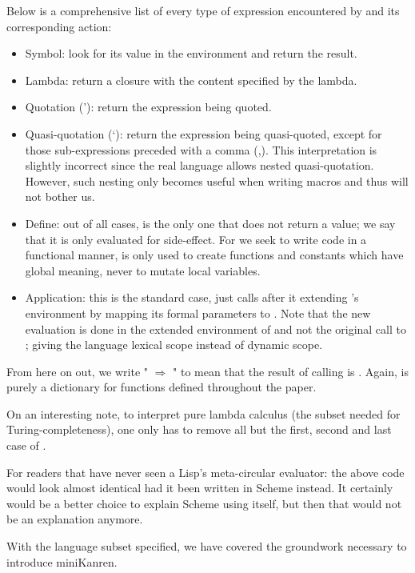 
Below is a comprehensive list of every type of expression encountered by  and its corresponding action:
\begin{itemize}
\item Symbol: look for its value in the environment and return the result.
\item Lambda: return a closure with the content specified by the lambda.
\item Quotation ('): return the expression being quoted.
\item Quasi-quotation (`): return the expression being quasi-quoted, except for those sub-expressions preceded with a comma (,). This interpretation is slightly incorrect since the real language allows nested quasi-quotation. However, such nesting only becomes useful when writing macros and thus will not bother us.
\item Define: out of all cases,  is the only one that does not return a value; we say that it is only evaluated for side-effect. For we seek to write code in a functional manner,   is only used to create functions and constants which have global meaning, never to mutate local variables. 
\item Application: this is the standard case,  just calls  after it extending 's environment by mapping its formal parameters to . Note that the new evaluation is done in the extended environment of  and not the original call to ; giving the language lexical scope instead of dynamic scope.
\end{itemize}

From here on out, we write " $\Rightarrow$ " to mean that the result of calling  is . Again,  is purely a dictionary for functions defined throughout the paper.

On an interesting note, to interpret pure lambda calculus (the subset needed for Turing-completeness), one only has to remove all but the first, second and last case of .

For readers that have never seen a Lisp's meta-circular evaluator: the above code would look almost identical had it been written in Scheme instead. It certainly would be a better choice to explain Scheme using itself, but then that would not be an explanation anymore.

With the language subset specified, we have covered the groundwork necessary to introduce miniKanren.
